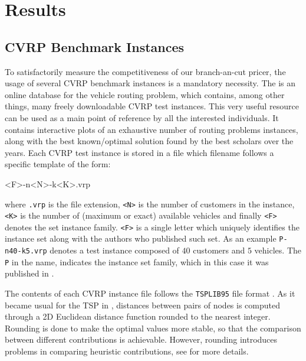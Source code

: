\chapter{Results}
\label{sec:results}

\section{CVRP Benchmark Instances}
\label{sec:results-benchmark-instances}
To satisfactorily measure the competitiveness of our branch-an-cut pricer,
the usage of several CVRP benchmark instances is a mandatory necessity.
The 
is an online database for the vehicle routing problem,
which contains, among other things,
many freely downloadable CVRP test instances.
This very useful resource can be used
as a main point of reference by all the interested individuals.
It contains interactive plots of an exhaustive number of routing problems instances,
along with the best known/optimal solution found by the best scholars over the years.
Each CVRP test instance is stored in a file which filename follows a specific template of the form:

\begin{center}
	\begin{LVerbatim}
		<F>-n<N>-k<K>.vrp
	\end{LVerbatim}
\end{center}

where \texttt{.vrp} is the file extension,
\texttt{<N>} is the number of customers in the instance,
\texttt{<K>} is the number of (maximum or exact) available vehicles
and finally \texttt{<F>} denotes the set instance family.
\texttt{<F>} is a single letter which uniquely identifies the instance
set along with the authors who published such set.
As an example \texttt{P-n40-k5.vrp} denotes a test instance composed
of $40$ customers and $5$ vehicles.
The \texttt{P} in the name, indicates the instance set family, which in this
case it was published in \textcite{augerat1995}.

The contents of each CVRP instance file follows the \texttt{TSPLIB95} file format \parencite{reinelt1995}.
As it became usual for the TSP in \textcite{reinelt1991},
distances between pairs of nodes
is computed through a 2D Euclidean distance function
rounded to the nearest integer.
Rounding is done to make the optimal values more stable, so that the comparison between different contributions is achievable.
However, rounding introduces problems in comparing heuristic contributions, see \textcite{uchoa2017} for more details.

